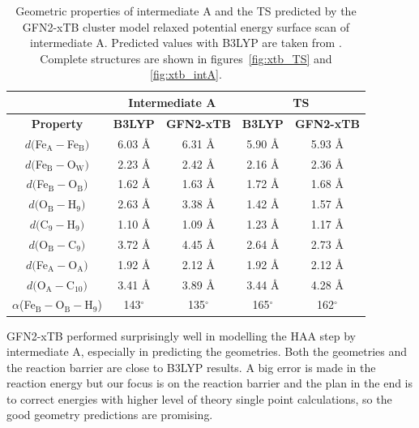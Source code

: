 \begin{table}[htbp]
\caption{Geometric properties of intermediate A and the TS predicted by the GFN2-xTB cluster model relaxed potential energy surface scan of intermediate A. Predicted values with B3LYP are taken from \cite{Yu2019}. Complete structures are shown in figures~\ref{fig:xtb_TS} and \ref{fig:xtb_intA}.}
\centering
\begin{tabular}{@{}ccccc@{}}
\cmidrule(l){2-5}
                                               & \multicolumn{2}{c}{\textbf{Intermediate A}} & \multicolumn{2}{c}{\textbf{TS}}    \\ \midrule
\textbf{Property}                              & \textbf{B3LYP}      & \textbf{GFN2-xTB}     & \textbf{B3LYP} & \textbf{GFN2-xTB} \\ \midrule
$d($Fe$_{\text{A}}-$Fe$_{\text{B}})$           & 6.03 Å              & 6.31 Å                & 5.90 Å         & 5.93 Å            \\
$d($Fe$_{\text{B}}-$O$_{\text{W}})$            & 2.23 Å              & 2.42 Å                & 2.16 Å         & 2.36 Å            \\
$d($Fe$_{\text{B}}-$O$_{\text{B}})$            & 1.62 Å              & 1.63 Å                & 1.72 Å         & 1.68 Å            \\
$d($O$_{\text{B}}-$H$_{\text{9}})$             & 2.63 Å              & 3.38 Å                & 1.42 Å         & 1.57 Å            \\
$d($C$_{\text{9}}-$H$_{\text{9}})$             & 1.10 Å              & 1.09 Å                & 1.23 Å         & 1.17 Å            \\
$d($O$_{\text{B}}-$C$_{\text{9}})$             & 3.72 Å              & 4.45 Å                & 2.64 Å         & 2.73 Å            \\
$d($Fe$_{\text{A}}-$O$_{\text{A}})$            & 1.92 Å              & 2.12 Å                & 1.92 Å         & 2.12 Å            \\
$d($O$_{\text{A}}-$C$_{\text{10}})$            & 3.41 Å              & 3.89 Å                & 3.44 Å         & 4.28 Å            \\
$\alpha$(Fe$_{\text{B}}-$O$_{\text{B}}-$H$_9$) & 143$^{\circ}$       & 135$^{\circ}$         & 165$^{\circ}$  & 162$^{\circ}$     \\ \bottomrule
\end{tabular}
\label{tab:xtb_geoemtry}
\end{table}

GFN2-xTB performed surprisingly well in modelling the HAA step by intermediate A, especially in predicting the geometries. Both the geometries and the reaction barrier are close to  B3LYP results. A big error is made in the reaction energy but our focus is on the reaction barrier and the plan in the end is to correct energies with higher level of theory single point calculations, so the good geometry predictions are promising.


